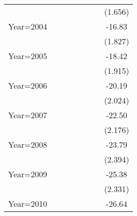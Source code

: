 \begin{table}[htbp]
\begin{tabular}{l*{7}{c}}
                &                  &                  &                  &                  &                  &                  &  (1.656)         \\
Year=2004       &                  &                  &                  &                  &                  &                  &   -16.83\sym{***}\\
                &                  &                  &                  &                  &                  &                  &  (1.827)         \\
Year=2005       &                  &                  &                  &                  &                  &                  &   -18.42\sym{***}\\
                &                  &                  &                  &                  &                  &                  &  (1.915)         \\
Year=2006       &                  &                  &                  &                  &                  &                  &   -20.19\sym{***}\\
                &                  &                  &                  &                  &                  &                  &  (2.024)         \\
Year=2007       &                  &                  &                  &                  &                  &                  &   -22.50\sym{***}\\
                &                  &                  &                  &                  &                  &                  &  (2.176)         \\
Year=2008       &                  &                  &                  &                  &                  &                  &   -23.79\sym{***}\\
                &                  &                  &                  &                  &                  &                  &  (2.394)         \\
Year=2009       &                  &                  &                  &                  &                  &                  &   -25.38\sym{***}\\
                &                  &                  &                  &                  &                  &                  &  (2.331)         \\
Year=2010       &                  &                  &                  &                  &                  &                  &   -26.64\sym{***}\\

\end{tabular}
\end{table}
